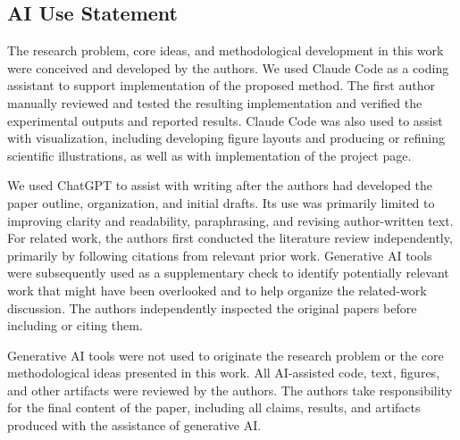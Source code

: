 \subsection*{AI Use Statement}

The research problem, core ideas, and methodological development in this work were conceived and developed by the authors.
We used Claude Code as a coding assistant to support implementation of the proposed method.
The first author manually reviewed and tested the resulting implementation and verified the experimental outputs and reported results.
Claude Code was also used to assist with visualization, including developing figure layouts and producing or refining scientific illustrations, as well as with implementation of the project page.

We used ChatGPT to assist with writing after the authors had developed the paper outline, organization, and initial drafts.
Its use was primarily limited to improving clarity and readability, paraphrasing, and revising author-written text.
For related work, the authors first conducted the literature review independently, primarily by following citations from relevant prior work.
Generative AI tools were subsequently used as a supplementary check to identify potentially relevant work that might have been overlooked and to help organize the related-work discussion.
The authors independently inspected the original papers before including or citing them.

Generative AI tools were not used to originate the research problem or the core methodological ideas presented in this work.
All AI-assisted code, text, figures, and other artifacts were reviewed by the authors.
The authors take responsibility for the final content of the paper, including all claims, results, and artifacts produced with the assistance of generative AI.